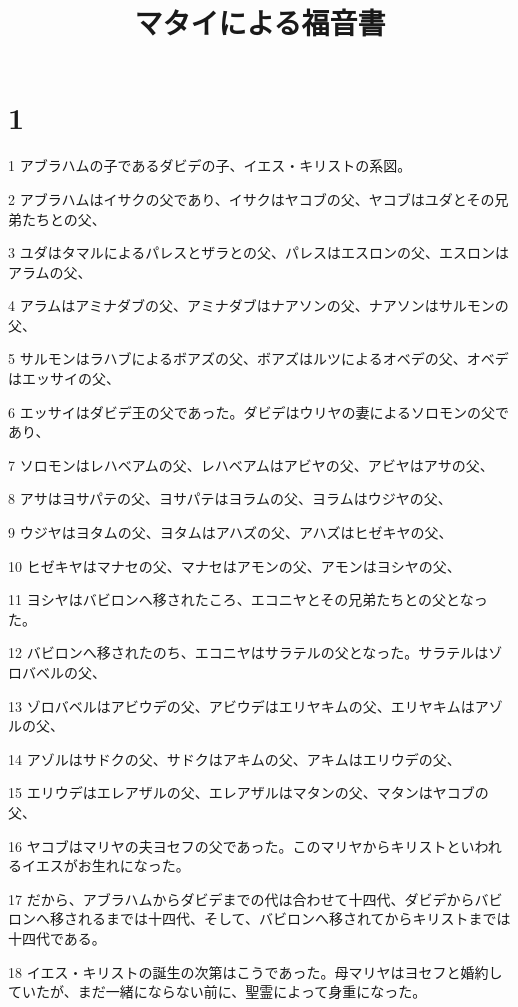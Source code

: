 

\title{マタイによる福音書}


\chapter{1}

\par 1 アブラハムの子であるダビデの子、イエス・キリストの系図。
\par 2 アブラハムはイサクの父であり、イサクはヤコブの父、ヤコブはユダとその兄弟たちとの父、
\par 3 ユダはタマルによるパレスとザラとの父、パレスはエスロンの父、エスロンはアラムの父、
\par 4 アラムはアミナダブの父、アミナダブはナアソンの父、ナアソンはサルモンの父、
\par 5 サルモンはラハブによるボアズの父、ボアズはルツによるオベデの父、オベデはエッサイの父、
\par 6 エッサイはダビデ王の父であった。ダビデはウリヤの妻によるソロモンの父であり、
\par 7 ソロモンはレハベアムの父、レハベアムはアビヤの父、アビヤはアサの父、
\par 8 アサはヨサパテの父、ヨサパテはヨラムの父、ヨラムはウジヤの父、
\par 9 ウジヤはヨタムの父、ヨタムはアハズの父、アハズはヒゼキヤの父、
\par 10 ヒゼキヤはマナセの父、マナセはアモンの父、アモンはヨシヤの父、
\par 11 ヨシヤはバビロンへ移されたころ、エコニヤとその兄弟たちとの父となった。
\par 12 バビロンへ移されたのち、エコニヤはサラテルの父となった。サラテルはゾロバベルの父、
\par 13 ゾロバベルはアビウデの父、アビウデはエリヤキムの父、エリヤキムはアゾルの父、
\par 14 アゾルはサドクの父、サドクはアキムの父、アキムはエリウデの父、
\par 15 エリウデはエレアザルの父、エレアザルはマタンの父、マタンはヤコブの父、
\par 16 ヤコブはマリヤの夫ヨセフの父であった。このマリヤからキリストといわれるイエスがお生れになった。
\par 17 だから、アブラハムからダビデまでの代は合わせて十四代、ダビデからバビロンへ移されるまでは十四代、そして、バビロンへ移されてからキリストまでは十四代である。
\par 18 イエス・キリストの誕生の次第はこうであった。母マリヤはヨセフと婚約していたが、まだ一緒にならない前に、聖霊によって身重になった。
